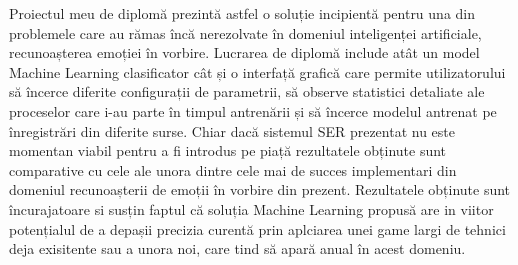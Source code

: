 \documentclass[a4paper,12pt]{book}
\begin{document}
		
		Proiectul meu de diplomă prezintă astfel o soluție incipientă pentru una din problemele care au rămas încă nerezolvate în domeniul inteligenței artificiale, recunoașterea emoției în vorbire. Lucrarea de diplomă include atât un model Machine Learning clasificator cât și o interfață grafică care permite utilizatorului să încerce diferite configurații de parametrii, să observe statistici detaliate ale proceselor care i-au parte în timpul antrenării și să încerce modelul antrenat pe înregistrări din diferite surse. Chiar dacă sistemul SER prezentat nu este momentan viabil pentru a fi introdus pe piață rezultatele obținute sunt comparative cu cele ale unora dintre cele mai de succes implementari din domeniul recunoașterii de emoții în vorbire din prezent. Rezultatele obținute sunt încurajatoare si susțin faptul că soluția Machine Learning propusă are in viitor potențialul de a depașii precizia curentă prin aplciarea unei game largi de tehnici deja exisitente sau a unora noi, care tind să apară anual în acest domeniu.		
			
		\renewcommand{\clearpage}{}
		\printbibliography[title={Bibliografie},notcategory=cited,resetnumbers=true]
		\printbibliography[title={Referinte},category=cited,resetnumbers=true]
		\newpage
\end{document}
